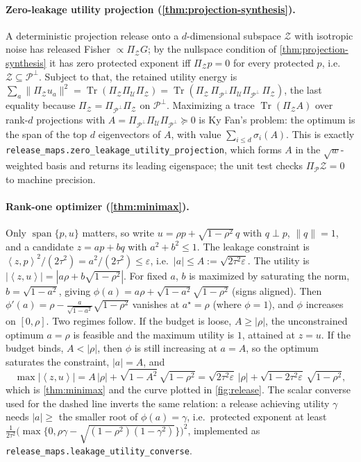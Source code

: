 \documentclass[11pt]{article}
\DeclareMathOperator{\Tr}{Tr}
\newcommand{\eps}{\varepsilon}
\newcommand{\calP}{\mathcal P}
\newcommand{\calU}{\mathcal U}
\newcommand{\calZ}{\mathcal Z}
\newcommand{\inner}[2]{\left\langle #1,#2\right\rangle}
\begin{document}
\paragraph{Zero-leakage utility projection (\cref{thm:projection-synthesis}).} A deterministic projection release onto a \(d\)-dimensional subspace \(\calZ\) with isotropic noise has released Fisher \(\propto \Pi_\calZ G\); by the nullspace condition of \cref{thm:projection-synthesis} it has zero protected exponent iff \(\Pi_\calZ p=0\) for every protected \(p\), i.e.\ \(\calZ\subseteq\calP^\perp\). Subject to that, the retained utility energy is \(\sum_{a}\|\Pi_\calZ u_a\|^2=\Tr(\Pi_\calZ\Pi_\calU\Pi_\calZ)=\Tr(\Pi_\calZ\,\Pi_{\calP^\perp}\Pi_\calU\Pi_{\calP^\perp}\,\Pi_\calZ)\), the last equality because \(\Pi_\calZ=\Pi_{\calP^\perp}\Pi_\calZ\) on \(\calP^\perp\). Maximizing a trace \(\Tr(\Pi_\calZ A)\) over rank-\(d\) projections with \(A=\Pi_{\calP^\perp}\Pi_\calU\Pi_{\calP^\perp}\succeq0\) is Ky Fan's problem: the optimum is the span of the top \(d\) eigenvectors of \(A\), with value \(\sum_{i\le d}\sigma_i(A)\). This is exactly \texttt{release\_maps.zero\_leakage\_utility\_projection}, which forms \(A\) in the \(\sqrt{w}\)-weighted basis and returns its leading eigenspace; the unit test checks \(\Pi_\calP\calZ=0\) to machine precision.

\paragraph{Rank-one optimizer (\cref{thm:minimax}).} Only \(\operatorname{span}\{p,u\}\) matters, so write \(u=\rho p+\sqrt{1-\rho^2}\,q\) with \(q\perp p\), \(\|q\|=1\), and a candidate \(z=ap+bq\) with \(a^2+b^2\le1\). The leakage constraint is \(\inner{z}{p}^2/(2\tau^2)=a^2/(2\tau^2)\le\eps\), i.e.\ \(|a|\le A:=\sqrt{2\tau^2\eps}\). The utility is \(|\inner{z}{u}|=|a\rho+b\sqrt{1-\rho^2}|\). For fixed \(a\), \(b\) is maximized by saturating the norm, \(b=\sqrt{1-a^2}\), giving \(\phi(a)=a\rho+\sqrt{1-a^2}\sqrt{1-\rho^2}\) (signs aligned). Then \(\phi'(a)=\rho-\tfrac{a}{\sqrt{1-a^2}}\sqrt{1-\rho^2}\) vanishes at \(a^\star=\rho\) (where \(\phi=1\)), and \(\phi\) increases on \([0,\rho]\). Two regimes follow. If the budget is loose, \(A\ge|\rho|\), the unconstrained optimum \(a=\rho\) is feasible and the maximum utility is \(1\), attained at \(z=u\). If the budget binds, \(A<|\rho|\), then \(\phi\) is still increasing at \(a=A\), so the optimum saturates the constraint, \(|a|=A\), and
\begin{equation}
\max|\inner{z}{u}|=A\,|\rho|+\sqrt{1-A^2}\,\sqrt{1-\rho^2}
=\sqrt{2\tau^2\eps}\,|\rho|+\sqrt{1-2\tau^2\eps}\,\sqrt{1-\rho^2},
\label{eq:appF-util}
\end{equation}
which is \cref{thm:minimax} and the curve plotted in \cref{fig:release}. The scalar converse used for the dashed line inverts the same relation: a release achieving utility \(\gamma\) needs \(|a|\ge\) the smaller root of \(\phi(a)=\gamma\), i.e.\ protected exponent at least \(\tfrac{1}{2\tau^2}\big(\max\{0,\rho\gamma-\sqrt{(1-\rho^2)(1-\gamma^2)}\}\big)^2\), implemented as \texttt{release\_maps.leakage\_utility\_converse}.
\end{document}
